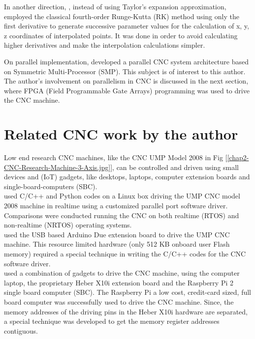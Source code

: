 In another direction, \cite{Bhattacharjee:2012}, instead of using Taylor's expansion approximation, employed the classical fourth-order Runge-Kutta (RK) method using only the first derivative to generate successive parameter values for the calculation of x, y, z coordinates of interpolated points. It was done in order to avoid calculating higher derivatives and make the interpolation calculations simpler.\\

\clearpage
\pagebreak

On parallel implementation, \cite{Fu:2016} developed a parallel CNC system architecture based on Symmetric Multi-Processor (SMP). This  subject is of interest to this author. The author's involvement on parallelism in CNC is discussed in the next section, where FPGA (Field Programmable Gate Arrays) programming was used to drive the CNC machine.\\


\section{Related CNC work by the author}

Low end research CNC machines, like the CNC UMP Model 2008 in Fig [\ref{chap2-CNC-Research-Machine-3-Axis.jpg}], can be controlled and driven using small devices and (IoT) gadgets, like desktops, laptops, computer extension boards and single-board-computers (SBC).\\ 

\cite{Kalimbetov:2012} used C/C++ and Python codes on a Linux box driving the UMP CNC model 2008 machine in realtime using a customized parallel port software driver. Comparisons were conducted running the CNC on both realtime (RTOS) and non-realtime (NRTOS) operating systems. \\

\cite{Ariffin:2014} used the USB based Arduino Due extension board to drive the UMP CNC machine. This resource limited hardware (only 512 KB onboard user Flash memory) required a special technique in writing the C/C++ codes for the CNC software driver.\\  

\cite{Abdelgader:2014} used a combination of gadgets to drive the CNC machine, using the computer laptop, the proprietary Heber X10i extension board and the Raspberry Pi 2 single board computer (SBC). The Raspberry Pi a low cost, credit-card sized, full board computer was successfully used to drive the CNC machine. Since, the memory addresses of the driving pins in the Heber X10i hardware are separated, a special technique was developed to get the memory register addresses contiguous. \\

